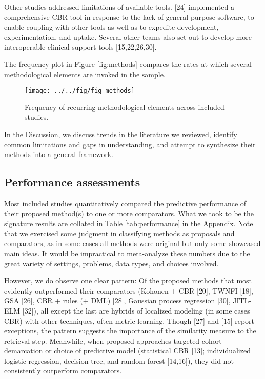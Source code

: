 \documentclass[preprint, 3p,
authoryear]{elsarticle} %
\begin{document}
Other studies addressed limitations of available tools. {[}24{]}
implemented a comprehensive CBR tool in response to the lack of
general-purpose software, to enable coupling with other tools as well as
to expedite development, experimentation, and uptake. Several other
teams also set out to develop more interoperable clinical support tools
{[}15,22,26,30{]}.

The frequency plot in Figure \ref{fig:methods} compares the rates at
which several methodological elements are invoked in the sample.

\begin{figure}

{\centering \texttt{[image: ../../fig/fig-methods]} 

}

\caption{\label{fig:methods}Frequency of recurring methodological elements across included studies.}\label{fig:fig:methods}
\end{figure}

In the Discussion, we discuss trends in the literature we reviewed,
identify common limitations and gaps in understanding, and attempt to
synthesize their methods into a general framework.

\hypertarget{performance-assessments}{%
\subsection{Performance assessments}\label{performance-assessments}}

\label{sec:performance}

Most included studies quantitatively compared the predictive performance
of their proposed method(s) to one or more comparators. What we took to
be the signature results are collated in Table \ref{tab:performance} in
the Appendix. Note that we exercised some judgment in classifying
methods as proposals and comparators, as in some cases all methods were
original but only some showcased main ideas. It would be impractical to
meta-analyze these numbers due to the great variety of settings,
problems, data types, and choices involved.

However, we do observe one clear pattern: Of the proposed methods that
most evidently outperformed their comparators (Kohonen + CBR {[}20{]},
TWNFI {[}18{]}, GSA {[}26{]}, CBR + rules (+ DML) {[}28{]}, Gaussian
process regression {[}30{]}, JITL-ELM {[}32{]}), all except the last are
hybrids of localized modeling (in some cases CBR) with other techniques,
often metric learning. Though {[}27{]} and {[}15{]} report exceptions,
the pattern suggests the importance of the similarity measure to the
retrieval step. Meanwhile, when proposed approaches targeted cohort
demarcation or choice of predictive model (statistical CBR {[}13{]};
individualized logistic regression, decision tree, and random forest
{[}14,16{]}), they did not consistently outperform comparators.
\end{document}

